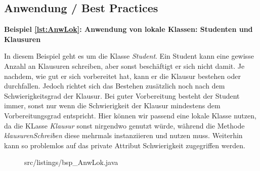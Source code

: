 \subsection{Anwendung / Best Practices}

{\bf Beispiel \ref{lst:AnwLok}: Anwendung von lokale Klassen: Studenten und Klausuren}

In diesem Beispiel geht es um die Klasse {\it Student}.
Ein Student kann eine gewisse Anzahl an Klausuren schreiben, aber sonst beschäftigt er sich nicht damit.
Je nachdem, wie gut er sich vorbereitet hat, kann er die Klausur bestehen oder durchfallen.
Jedoch richtet sich das Bestehen zusätzlich noch nach dem Schwierigkeitsgrad der Klausur.
Bei guter Vorbereitung besteht der Student immer, sonst nur wenn die  Schwierigkeit der Klausur mindestens dem Vorbereitungsgrad entspricht.
Hier können wir passend eine lokale Klasse nutzen, da die KLasse {\it Klausur} sonst nirgendwo genutzt würde, während die Methode {\it klausurenSchreiben} diese mehrmals instanziieren und nutzen muss.
Weiterhin kann so problemlos auf das private Attribut Schwierigkeit zugegriffen werden.
\\
\newpage
\begin{figure}[H]
\lstset{language=Java}
 {src/listings/bsp_AnwLok.java}
\end{figure}
\newpage
